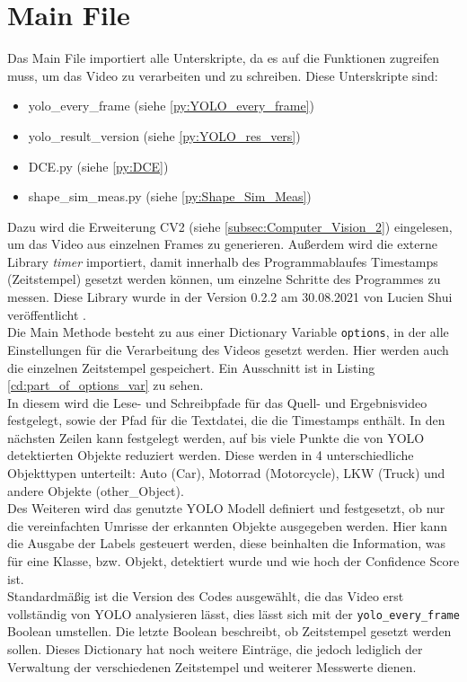 \section{Main File}
{ 
	Das Main File importiert alle Unterskripte, da es auf die Funktionen zugreifen muss, um das Video zu verarbeiten und zu schreiben. Diese Unterskripte sind: 
	\begin{itemize}
		\item yolo\_every\_frame (siehe \ref{py:YOLO_every_frame})
		\item yolo\_result\_version (siehe \ref{py:YOLO_res_vers})
		\item DCE.py (siehe \ref{py:DCE})
		\item shape\_sim\_meas.py (siehe \ref{py:Shape_Sim_Meas})
	\end{itemize}
	Dazu wird die Erweiterung CV2 (siehe \ref{subsec:Computer_Vision_2}) eingelesen, um das Video aus einzelnen Frames zu generieren.
	Außerdem wird die externe Library \textit{timer} importiert, damit innerhalb des Programmablaufes Timestamps (Zeitstempel) gesetzt werden können, um einzelne Schritte des Programmes zu messen. Diese Library wurde in der Version 0.2.2 am 30.08.2021 von Lucien Shui veröffentlicht \citep{Shui2021}.  \\
	Die Main Methode besteht zu aus einer Dictionary Variable \lstinline|options|, in der alle Einstellungen für die Verarbeitung des Videos gesetzt werden. Hier werden auch die einzelnen Zeitstempel gespeichert. Ein Ausschnitt ist in Listing \ref{cd:part_of_options_var} zu sehen. \\
	In diesem wird die Lese- und Schreibpfade für das Quell- und Ergebnisvideo festgelegt, sowie der Pfad für die Textdatei, die die Timestamps enthält. In den nächsten Zeilen kann festgelegt werden, auf bis viele Punkte die von YOLO detektierten Objekte reduziert werden. Diese werden in 4 unterschiedliche Objekttypen unterteilt: Auto (Car), Motorrad (Motorcycle), LKW (Truck) und andere Objekte (other\_Object). \\
	Des Weiteren wird das genutzte YOLO Modell definiert und festgesetzt, ob nur die vereinfachten Umrisse der erkannten Objekte ausgegeben werden. Hier kann die Ausgabe der Labels gesteuert werden, diese beinhalten die Information, was für eine Klasse, bzw. Objekt, detektiert wurde und wie hoch der Confidence Score ist. \\
	Standardmäßig ist die Version des Codes ausgewählt, die das Video erst vollständig von YOLO analysieren lässt, dies lässt sich mit der \lstinline|yolo_every_frame| Boolean umstellen. Die letzte Boolean beschreibt, ob Zeitstempel gesetzt werden sollen. Dieses Dictionary hat noch weitere Einträge, die jedoch lediglich der Verwaltung der verschiedenen Zeitstempel und weiterer Messwerte dienen. \\
	

}
